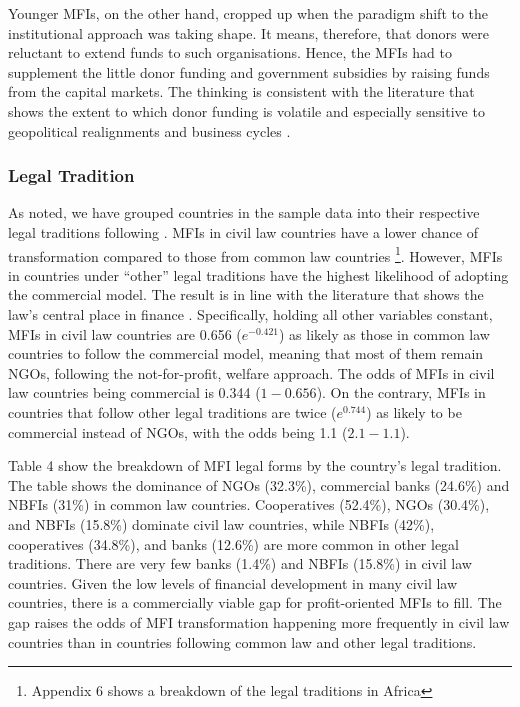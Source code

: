 \documentclass[a4paper,nobind]{templates/ociamthesis}
\begin{document}
Younger MFIs, on the other hand, cropped up when the paradigm shift to the institutional approach was taking shape. It means, therefore, that donors were reluctant to extend funds to such organisations. Hence, the MFIs had to supplement the little donor funding and government subsidies by raising funds from the capital markets. The thinking is consistent with the literature that shows the extent to which donor funding is volatile and especially sensitive to geopolitical realignments \autocite{garmaise2013cheap,d2017aid} and business cycles \autocite{wagner2013vulnerability}.

\hypertarget{legal-tradition}{%
\subsubsection{Legal Tradition}\label{legal-tradition}}

As noted, we have grouped countries in the sample data into their respective legal traditions following \textcite{oto2014distribution}. MFIs in civil law countries have a lower chance of transformation compared to those from common law countries \footnote{Appendix 6 shows a breakdown of the legal traditions in Africa}. However, MFIs in countries under ``other'' legal traditions have the highest likelihood of adopting the commercial model. The result is in line with the literature that shows the law's central place in finance \autocite{la2013law}. Specifically, holding all other variables constant, MFIs in civil law countries are 0.656 (\(e^{-0.421}\)) as likely as those in common law countries to follow the commercial model, meaning that most of them remain NGOs, following the not-for-profit, welfare approach. The odds of MFIs in civil law countries being commercial is 0.344 (\(1 - 0.656\)). On the contrary, MFIs in countries that follow other legal traditions are twice (\(e^{0.744}\)) as likely to be commercial instead of NGOs, with the odds being 1.1 (\(2.1 - 1.1\)).

Table 4 show the breakdown of MFI legal forms by the country's legal tradition. The table shows the dominance of NGOs (32.3\%), commercial banks (24.6\%) and NBFIs (31\%) in common law countries. Cooperatives (52.4\%), NGOs (30.4\%), and NBFIs (15.8\%) dominate civil law countries, while NBFIs (42\%), cooperatives (34.8\%), and banks (12.6\%) are more common in other legal traditions. There are very few banks (1.4\%) and NBFIs (15.8\%) in civil law countries. Given the low levels of financial development in many civil law countries, there is a commercially viable gap for profit-oriented MFIs to fill. The gap raises the odds of MFI transformation happening more frequently in civil law countries than in countries following common law and other legal traditions.
\end{document}
